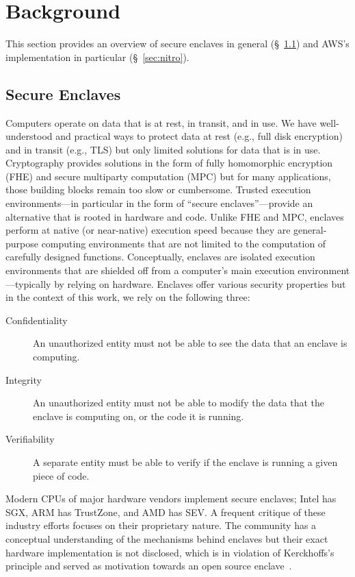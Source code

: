\section{Background}
\label{sec:background}

This section provides an overview of secure enclaves in general
(\S~\ref{sec:enclaves}) and AWS's implementation in particular
(\S~\ref{sec:nitro}).

\subsection{Secure Enclaves}
\label{sec:enclaves}

Computers operate on data that is at rest, in transit, and in use.  We have
well-understood and practical ways to protect data at rest (e.g., full disk
encryption) and in transit (e.g., TLS) but only limited solutions for data that
is in use.  Cryptography provides solutions in the form of fully homomorphic
encryption (FHE) and secure multiparty computation (MPC) but for many
applications, those building blocks remain too slow or cumbersome.  Trusted
execution environments---in particular in the form of ``secure
enclaves''---provide an alternative that is rooted in hardware and code.
Unlike FHE and MPC, enclaves perform at native (or near-native) execution speed
because they are general-purpose computing environments that are not limited to
the computation of carefully designed functions.  Conceptually, enclaves are
isolated execution environments that are shielded off from a computer's main
execution environment---typically by relying on hardware.  Enclaves offer
various security properties but in the context of this work, we rely on the
following three:

\begin{description}
  \item[Confidentiality] An unauthorized entity must not be able to see the
    data that an enclave is computing.

  \item[Integrity] An unauthorized entity must not be able to modify the data
    that the enclave is computing on, or the code it is running.

  \item[Verifiability] A separate entity must be able to verify if the enclave
    is running a given piece of code.
\end{description}

Modern CPUs of major hardware vendors implement secure enclaves; Intel has SGX,
ARM has TrustZone, and AMD has SEV.  A frequent critique of these industry
efforts focuses on their proprietary nature. The community has a conceptual
understanding of the mechanisms behind enclaves but their exact hardware
implementation is not disclosed, which is in violation of Kerckhoffs's
principle and served as motivation towards an open source
enclave~\cite{Lee20a}.


